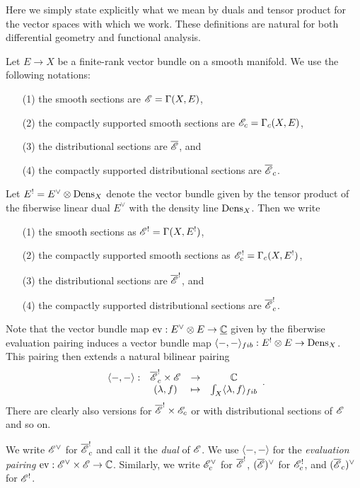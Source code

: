 Here we simply state explicitly what we mean by duals and tensor product for the vector spaces with which we work.
These definitions are natural for both differential geometry and functional analysis.

Let $E \to X$ be a finite-rank vector bundle on a smooth manifold.
We use the following notations:
\begin{enumerate}
\item[(1)] the smooth sections are $\mathscr E = \Gamma(X,E)$,
\item[(2)] the compactly supported smooth sections are $\mathscr E_c = \Gamma_c(X,E)$,
\item[(3)] the distributional sections are $\overline{\mathscr E}$, and
\item[(4)] the compactly supported distributional sections are $\overline{\mathscr E}_c$.
\end{enumerate}
Let $E^! = E^\vee \otimes {\rm Dens}_X$ denote the vector bundle given by 
the tensor product of the fiberwise linear dual $E^\vee$ with the density line ${\rm Dens}_X$.
Then we write
\begin{enumerate}
\item[(1)] the smooth sections as $\mathscr E^! = \Gamma(X,E^!)$,
\item[(2)] the compactly supported smooth sections as $\mathscr E_c^! = \Gamma_c(X,E^!)$,
\item[(3)] the distributional sections are $\overline{\mathscr E}^!$, and
\item[(4)] the compactly supported distributional sections are $\overline{\mathscr E}_c^!$.
\end{enumerate}
Note that the vector bundle map ${\rm ev}: E^\vee \otimes E \to \underline{\mathbb C}$ given by the fiberwise evaluation pairing 
induces a vector bundle map $\langle-,-\rangle_{fib}: E^! \otimes E \to {\rm Dens}_X$.
This pairing then extends a natural bilinear pairing 
\[
\begin{array}{cccc}
\langle-,-\rangle: &\overline{\mathscr E}^!_c \times \mathscr E & \to & \mathbb C \\
& (\lambda,f) & \mapsto & \int_X \langle \lambda, f\rangle_{fib}
\end{array}.
\]
There are clearly also versions for $\overline{\mathscr E}^! \times \mathscr E_c$ or with distributional sections of $\mathscr E$ and so on.

\begin{dfn}
We write $\mathscr E^\vee$ for $\overline{\mathscr E}^!_c$ and call it the {\em dual} of $\mathscr E$. 
We use $\langle-,-\rangle$ for the {\em evaluation pairing} ${\rm ev}: \mathscr E^\vee \times \mathscr E \to \mathbb C$.
Similarly, we write $\mathscr E_c^\vee$ for $\overline{\mathscr E}^!$, $(\overline{\mathscr E})^\vee$  for $\mathscr E^!_c$, and $(\overline{\mathscr E}_c)^\vee$  for $\mathscr E^!$.
\end{dfn}

